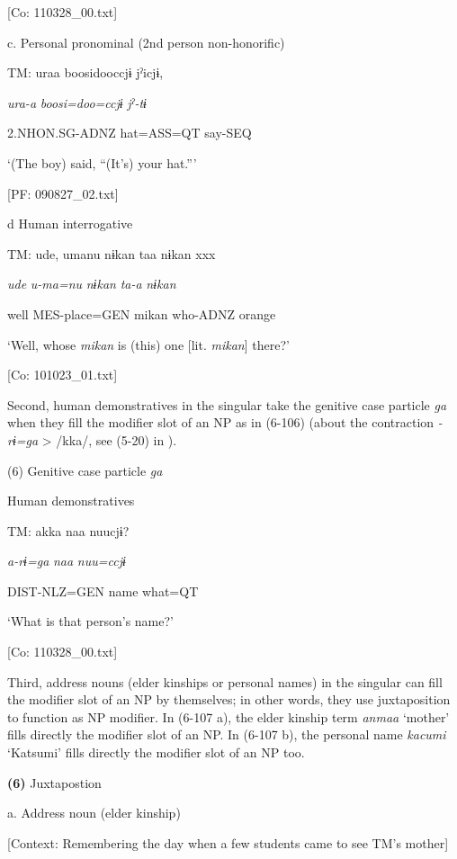       [Co: 110328\_00.txt]

  c.  Personal pronominal (2nd person non-honorific)

    TM:  uraa  {\textbar}boosi{\textbar}dooccjɨ  jˀicjɨ,

      \textit{ura-a}  \textit{boosi=doo=ccjɨ}  \textit{jˀ-tɨ}

      2.NHON.SG-ADNZ  hat=ASS=QT  say-SEQ

      ‘(The boy) said, “(It’s) your hat.”’

      [PF: 090827\_02.txt]

  d  Human interrogative

    TM:  ude,  umanu  nɨkan  taa  nɨkan  xxx

      \textit{ude}  \textit{u-ma=nu}  \textit{nɨkan}  \textit{ta-a}  \textit{nɨkan}  

      well  MES-place=GEN  mikan  who-ADNZ  orange  

      ‘Well, whose \textit{mikan} is (this) one [lit. \textit{mikan}] there?’

      [Co: 101023\_01.txt]

  Second, human demonstratives in the singular take the genitive case particle \textit{ga} when they fill the modifier slot of an NP as in (6-106) (about the contraction \textit{{}-rɨ=ga} > /kka/, see (5-20) in ).

(6)  Genitive case particle \textit{ga}

  Human demonstratives

  TM:  akka  naa  nuucjɨ?

    \textit{a-rɨ=ga}  \textit{naa}  \textit{nuu=ccjɨ}

    DIST-NLZ=GEN  name  what=QT

    ‘What is that person’s name?’

    [Co: 110328\_00.txt]

  Third, address nouns (elder kinships or personal names) in the singular can fill the modifier slot of an NP by themselves; in other words, they use juxtaposition to function as NP modifier. In (6-107 a), the elder kinship term \textit{anmaa} ‘mother’ fills directly the modifier slot of an NP. In (6-107 b), the personal name \textit{kacumi} ‘Katsumi’ fills directly the modifier slot of an NP too.

\textbf{(6)}  Juxtapostion

  a.  Address noun (elder kinship)

    [Context: Remembering the day when a few students came to see TM’s mother]

